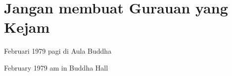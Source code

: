 \chapter{Jangan membuat Gurauan yang Kejam} %

 Februari 1979 pagi di Aula Buddha

 February 1979 am in Buddha Hall


